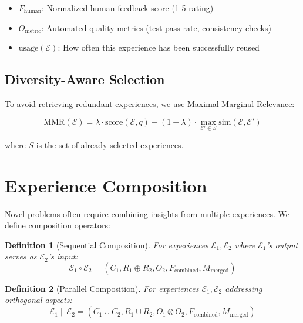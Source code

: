 \documentclass[11pt,letterpaper]{article}
\newtheorem{definition}{Definition}[section]
\begin{document}
\begin{itemize}
    \item $F_{\text{human}}$: Normalized human feedback score (1-5 rating)
    \item $O_{\text{metric}}$: Automated quality metrics (test pass rate, consistency checks)
    \item $\text{usage}(\mathcal{E})$: How often this experience has been successfully reused
\end{itemize}

\subsection{Diversity-Aware Selection}

To avoid retrieving redundant experiences, we use Maximal Marginal Relevance:

\begin{equation}
\text{MMR}(\mathcal{E}) = \lambda \cdot \text{score}(\mathcal{E}, q) - (1-\lambda) \cdot \max_{\mathcal{E}' \in S} \text{sim}(\mathcal{E}, \mathcal{E}')
\end{equation}

where $S$ is the set of already-selected experiences.

\section{Experience Composition}
\label{sec:composition}

Novel problems often require combining insights from multiple experiences. We define composition operators:

\begin{definition}[Sequential Composition]
For experiences $\mathcal{E}_1, \mathcal{E}_2$ where $\mathcal{E}_1$'s output serves as $\mathcal{E}_2$'s input:
\begin{equation}
\mathcal{E}_1 \circ \mathcal{E}_2 = (C_1, R_1 \oplus R_2, O_2, F_{\text{combined}}, M_{\text{merged}})
\end{equation}
\end{definition}

\begin{definition}[Parallel Composition]
For experiences $\mathcal{E}_1, \mathcal{E}_2$ addressing orthogonal aspects:
\begin{equation}
\mathcal{E}_1 \parallel \mathcal{E}_2 = (C_1 \cup C_2, R_1 \cup R_2, O_1 \otimes O_2, F_{\text{combined}}, M_{\text{merged}})
\end{equation}
\end{definition}
\end{document}
